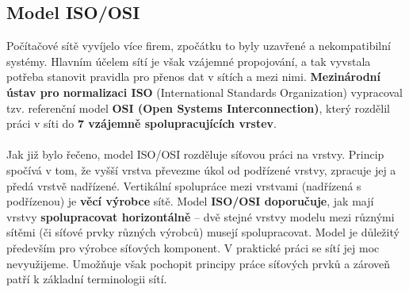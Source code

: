 \subsection*{Model ISO/OSI}
Počítačové sítě vyvíjelo více firem, zpočátku to byly uzavřené a nekompatibilní systémy. Hlavním účelem sítí je však vzájemné propojování, a tak vyvstala potřeba stanovit pravidla pro přenos dat v sítích a mezi nimi. \textbf{Mezinárodní ústav pro normalizaci ISO} (International Standards Organization) vypracoval tzv. referenční model \textbf{OSI (Open Systems Interconnection)}, který rozdělil práci v síti do \textbf{7 vzájemně spolupracujících vrstev}.
\\\\
Jak již bylo řečeno, model ISO/OSI rozděluje síťovou práci na vrstvy. Princip spočívá v tom, že vyšší vrstva převezme úkol od podřízené vrstvy, zpracuje jej a předá vrstvě nadřízené. Vertikální spolupráce mezi vrstvami (nadřízená s podřízenou) je \textbf{věcí výrobce} sítě. Model \textbf{ISO/OSI doporučuje}, jak mají vrstvy \textbf{spolupracovat horizontálně} – dvě stejné vrstvy modelu mezi různými sítěmi (či síťové prvky různých výrobců) musejí spolupracovat. Model je důležitý především pro výrobce síťových komponent. V praktické práci se sítí jej moc nevyužijeme. Umožňuje však pochopit principy práce síťových prvků a zároveň patří k základní terminologii sítí.

